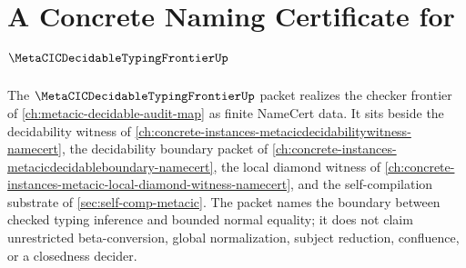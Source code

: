 \chapter{A Concrete Naming Certificate for $\MetaCICDecidableTypingFrontierUp$}
\label{ch:concrete-instances-metacic-decidable-typing-frontier-namecert}

The $\MetaCICDecidableTypingFrontierUp$ packet realizes the checker frontier of \autoref{ch:metacic-decidable-audit-map} as finite NameCert data. It sits beside the decidability witness of \autoref{ch:concrete-instances-metacicdecidabilitywitness-namecert}, the decidability boundary packet of \autoref{ch:concrete-instances-metacicdecidableboundary-namecert}, the local diamond witness of \autoref{ch:concrete-instances-metacic-local-diamond-witness-namecert}, and the self-compilation substrate of \autoref{sec:self-comp-metacic}. The packet names the boundary between checked typing inference and bounded normal equality; it does not claim unrestricted beta-conversion, global normalization, subject reduction, confluence, or a closedness decider.



